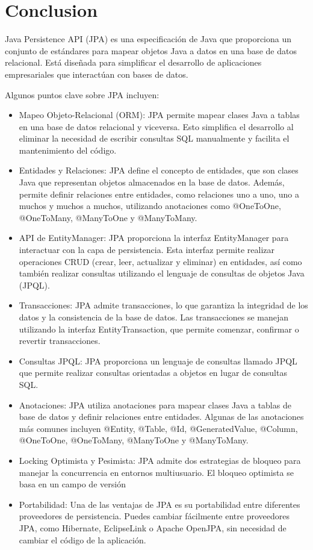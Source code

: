 \documentclass{article}
\begin{document}
\section*{Conclusion}

Java Persistence API (JPA) es una especificación de Java que proporciona un conjunto de estándares para mapear objetos Java a datos en una base de datos relacional. 
Está diseñada para simplificar el desarrollo de aplicaciones empresariales que interactúan con bases de datos.

Algunos puntos clave sobre JPA incluyen:
   \begin{itemize}
    \item Mapeo Objeto-Relacional (ORM): JPA permite mapear clases Java a tablas en una base de datos relacional y viceversa. 
    Esto simplifica el desarrollo al eliminar la necesidad de escribir consultas SQL manualmente y facilita el mantenimiento del código.
    \item Entidades y Relaciones: JPA define el concepto de entidades, que son clases Java que representan objetos almacenados en la base de datos.
    Además, permite definir relaciones entre entidades, como relaciones uno a uno, uno a muchos y muchos a muchos, utilizando anotaciones como @OneToOne, @OneToMany, @ManyToOne y @ManyToMany.
    \item API de EntityManager: JPA proporciona la interfaz EntityManager para interactuar con la capa de persistencia. Esta interfaz permite realizar operaciones CRUD 
    (crear, leer, actualizar y eliminar) en entidades, así como también realizar consultas utilizando el lenguaje de consultas de objetos Java (JPQL).
    \item Transacciones: JPA admite transacciones, lo que garantiza la integridad de los datos y la consistencia de la base de datos. Las transacciones se manejan utilizando la interfaz 
    EntityTransaction,  que permite comenzar, confirmar o revertir transacciones.
    \item Consultas JPQL: JPA proporciona un lenguaje de consultas llamado JPQL que permite realizar consultas orientadas a objetos en lugar de consultas SQL.
    \item Anotaciones: JPA utiliza anotaciones para mapear clases Java a tablas de base de datos y definir relaciones entre entidades. Algunas de las anotaciones más comunes 
    incluyen @Entity, @Table, @Id, @GeneratedValue, @Column, @OneToOne, @OneToMany, @ManyToOne y @ManyToMany.
    \item Locking Optimista y Pesimista: JPA admite dos estrategias de bloqueo para manejar la concurrencia en entornos multiusuario. El bloqueo optimista se basa en un campo de versión
    \item   Portabilidad: Una de las ventajas de JPA es su portabilidad entre diferentes proveedores de persistencia. Puedes cambiar fácilmente entre proveedores JPA, como Hibernate, EclipseLink o Apache OpenJPA,
     sin necesidad de cambiar el código de la aplicación.
   \end{itemize}
    
\end{document}
